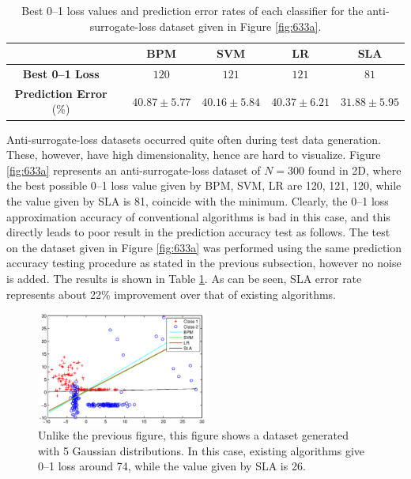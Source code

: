 \begin{table}[htbp!]
\centering
\begin{tabular}{|cc|  ccc|c|}
\hline\hline
 && {\bf BPM} & {\bf SVM} & {\bf LR} & {\bf SLA}\\  
\hline
{\bf Best 0--1 Loss} && 
$120$ & $121$ & $121$ & $81$ \\  
{\bf Prediction Error} (\%) && 
$40.87 \pm 5.77$ & $40.16 \pm 5.84$ & $40.37 \pm 6.21$ & $31.88 \pm 5.95$ \\  
\hline\hline
\end{tabular}
\caption{Best 0--1 loss values and prediction error rates of each
  classifier for the anti-surrogate-loss dataset given in Figure
  \ref{fig:633a}.}
\label{tab:antirates}
\end{table}


Anti-surrogate-loss datasets occurred quite often during test data
generation. These, however, have high dimensionality, hence are hard
to visualize. Figure \ref{fig:633a} represents an anti-surrogate-loss
dataset of $N=300$ found in 2D, where the best possible 0--1 loss
value given by BPM, SVM, LR are 120, 121, 120, while the value given
by SLA is 81, coincide with the minimum. Clearly, the 0--1 loss
approximation accuracy of conventional algorithms is bad in this case,
and this directly leads to poor result in the prediction accuracy test
as follows. The test on the dataset given in Figure \ref{fig:633a} was
performed using the same prediction accuracy testing procedure as
stated in the previous subsection, however no noise is added. The
results is shown in Table \ref{tab:antirates}. As can be seen, SLA
error rate represents about 22\% improvement over that of existing
algorithms.

\begin{figure}[here]
\includegraphics[width=0.50\textwidth]{images/fig63_633b.eps}
\caption{ Unlike the previous figure, this figure shows a dataset
  generated with 5 Gaussian distributions. In this case, existing
  algorithms give 0--1 loss around 74, while the value given by SLA is
  26.  }
\label{fig:633b}
\end{figure}

